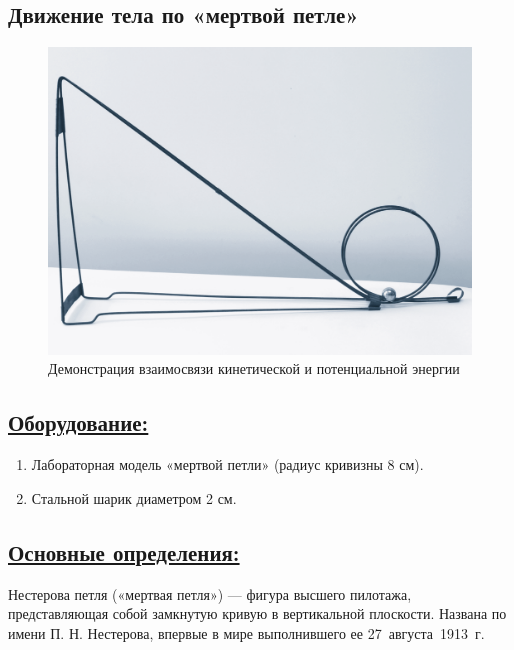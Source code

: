 \documentclass[14pt,a4paper,oneside]{extarticle}	%
\begin{document}

\begin{center}
	\subsection*{Движение тела по «мертвой петле»}
\end{center}

\begin{figure}[H] 
	\centering 		
	\includegraphics[width=0.75\linewidth]{loop-1.png}
	\caption{Демонстрация взаимосвязи кинетической и потенциальной энергии}
	\label{loop-1}
\end{figure}

\subsection*{\underline{Оборудование:}}

\begin{enumerate}
	\item Лабораторная модель «мертвой петли» (радиус кривизны 8 см).
	\item Стальной шарик диаметром 2 см.
\end{enumerate}

\newpage
\subsection*{\underline{Основные определения:}}

Нестерова петля («мертвая петля») — фигура высшего пилотажа, 
представляющая собой замкнутую кривую в вертикальной плоскости. 
Названа по имени П. Н. Нестерова, впервые в мире выполнившего ее 27~августа~1913~г.
\end{document}

